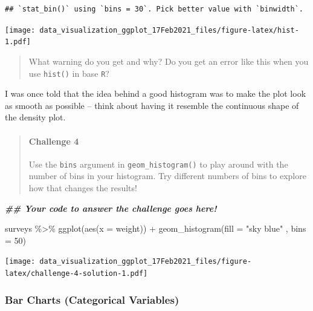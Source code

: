 \documentclass[
]{article}
\newenvironment{Shaded}{\begin{snugshade}}{\end{snugshade}}
\newcommand{\AttributeTok}[1]{\textcolor[rgb]{0.77,0.63,0.00}{#1}}
\newcommand{\DecValTok}[1]{\textcolor[rgb]{0.00,0.00,0.81}{#1}}
\newcommand{\DocumentationTok}[1]{\textcolor[rgb]{0.56,0.35,0.01}{\textbf{\textit{#1}}}}
\newcommand{\FunctionTok}[1]{\textcolor[rgb]{0.00,0.00,0.00}{#1}}
\newcommand{\NormalTok}[1]{#1}
\newcommand{\SpecialCharTok}[1]{\textcolor[rgb]{0.00,0.00,0.00}{#1}}
\newcommand{\StringTok}[1]{\textcolor[rgb]{0.31,0.60,0.02}{#1}}
\begin{document}
\begin{verbatim}
## `stat_bin()` using `bins = 30`. Pick better value with `binwidth`.
\end{verbatim}

\texttt{[image: data\_visualization\_ggplot\_17Feb2021\_files/figure-latex/hist-1.pdf]}

\begin{quote}
What warning do you get and why? Do you get an error like this when you
use \texttt{hist()} in base \texttt{R}?
\end{quote}

I was once told that the idea behind a good histogram was to make the
plot look as smooth as possible -- think about having it resemble the
continuous shape of the density plot.

\begin{quote}
\mbox{}%
\hypertarget{challenge-4}{%
\paragraph{Challenge 4}\label{challenge-4}}

Use the \texttt{bins} argument in \texttt{geom\_histogram()} to play
around with the number of bins in your histogram. Try different numbers
of bins to explore how that changes the results!
\end{quote}

\begin{Shaded}
\begin{Highlighting}[]
\DocumentationTok{\#\# Your code to answer the challenge goes here!}
\end{Highlighting}
\end{Shaded}

\begin{Shaded}
\begin{Highlighting}[]
\NormalTok{surveys }\SpecialCharTok{\%\textgreater{}\%} 
  \FunctionTok{ggplot}\NormalTok{(}\FunctionTok{aes}\NormalTok{(}\AttributeTok{x =}\NormalTok{ weight)) }\SpecialCharTok{+} 
  \FunctionTok{geom\_histogram}\NormalTok{(}\AttributeTok{fill =} \StringTok{"sky blue"}\NormalTok{ , }\AttributeTok{bins =} \DecValTok{50}\NormalTok{)}
\end{Highlighting}
\end{Shaded}

\texttt{[image: data\_visualization\_ggplot\_17Feb2021\_files/figure-latex/challenge-4-solution-1.pdf]}

\hypertarget{bar-charts-categorical-variables}{%
\subsubsection{Bar Charts (Categorical
Variables)}\label{bar-charts-categorical-variables}}
\end{document}
